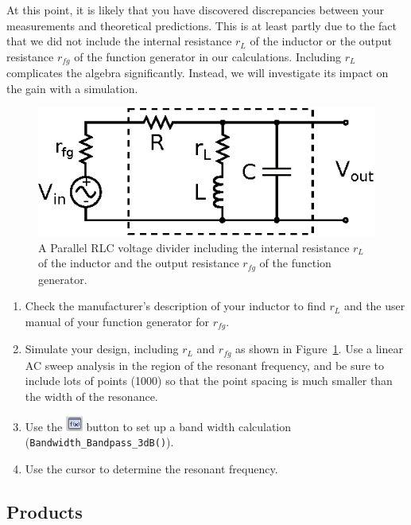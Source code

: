 \documentclass[11pt]{article}
\begin{document}
At this point, it is likely that you have discovered discrepancies
between your measurements and theoretical predictions. This is at
least partly due to the fact that we did not include the internal
resistance $r_L$ of the inductor or the output resistance $r_{fg}$ of
the function generator in our calculations. Including $r_L$
complicates the algebra significantly. Instead, we will investigate
its impact on the gain with a simulation.

\begin{figure}[h]
\centering
\includegraphics{rlcparallelreal.eps}
\caption{A Parallel RLC voltage divider including the internal
  resistance $r_L$ of the inductor and the output resistance $r_{fg}$
  of the function generator.} 
\label{fig:rlcparallelreal}
\end{figure}

\begin{enumerate}
\item Check the manufacturer's description of your inductor to find
  $r_L$ and the user manual of your function generator for $r_{fg}$.

\item Simulate your design, including $r_L$ and $r_{fg}$ as shown in
Figure~\ref{fig:rlcparallelreal}.  Use a linear AC sweep analysis in
the region of the resonant frequency, and be sure to include lots of
points (1000) so that the point spacing is much smaller than the width
of the resonance.

\item Use the \includegraphics{PSpiceAD_DefineMeasurement.png} button
  to set up a band width calculation
  (\verb+Bandwidth_Bandpass_3dB()+).

\item Use the cursor to determine the resonant frequency.
\end{enumerate}

\subsection*{Products}
\end{document}
